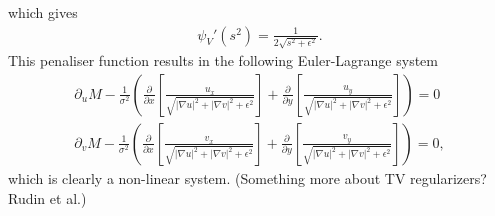 which gives
\begin{align*}
\psi_V'(s^2) = \frac{1}{2 \sqrt{s^2 + \epsilon^2}}.
\end{align*}
This penaliser function results in the following Euler-Lagrange system
\begin{equation}
\begin{aligned}
\label{EL_LD}
\partial_u M - \frac{1}{\sigma^2} \left(\frac{\partial}{\partial x}\left[ \frac{u_x}{\sqrt{|\nabla u|^2 + |\nabla v|^2  + \epsilon^2}} \right] + \frac{\partial}{\partial y} \left[ \frac{u_y}{\sqrt{|\nabla u|^2 + |\nabla v|^2  + \epsilon^2}} \right] \right) = 0 \\
\partial_v M - \frac{1}{\sigma^2} \left(\frac{\partial}{\partial x}\left[ \frac{v_x}{\sqrt{|\nabla u|^2 + |\nabla v|^2 + \epsilon^2}} \right] + \frac{\partial}{\partial y} \left[ \frac{v_y}{\sqrt{|\nabla u|^2 + |\nabla v|^2 + \epsilon^2}} \right] \right) = 0,
\end{aligned}
\end{equation}
which is clearly a non-linear system. (Something more about TV regularizers? Rudin et al.)


